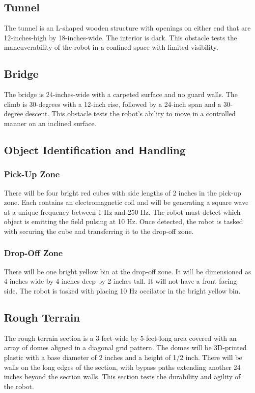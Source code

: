 \subsection{Tunnel}
The tunnel is an L-shaped wooden structure with openings on either end that are 12-inches-high by 18-inches-wide. The interior is dark. This obstacle tests the maneuverability of the robot in a confined space with limited visibility.

\subsection{Bridge}
The bridge is 24-inches-wide with a carpeted surface and no guard walls. The climb is 30-degrees with a 12-inch rise, followed by a 24-inch span and a 30-degree descent. This obstacle tests the robot’s ability to move in a controlled manner on an inclined surface.

\subsection{Object Identification and Handling}
	\subsubsection{Pick-Up Zone}
		There will be four bright red cubes with side lengths of 2 inches in the pick-up zone. Each contains an electromagnetic coil and will be generating a square wave at a unique frequency between 1 Hz and 250 Hz. The robot must detect which object is emitting the field pulsing at 10 Hz. Once detected, the robot is tasked with securing the cube and transferring it to the drop-off zone.
	\subsubsection{Drop-Off Zone}
		There will be one bright yellow bin at the drop-off zone. It will be dimensioned as 4 inches wide by 4 inches deep by 2 inches tall. It will not have a front facing side. The robot is tasked with placing 10 Hz occilator in the bright yellow bin.

\subsection{Rough Terrain}
The rough terrain section is a 3-feet-wide by 5-feet-long area covered with an array of domes aligned in a diagonal grid pattern. The domes will be 3D-printed plastic with a base diameter of 2 inches and a height of 1/2 inch. There will be walls on the long edges of the section, with bypass paths extending another 24 inches beyond the section walls. This section tests the durability and agility of the robot.

